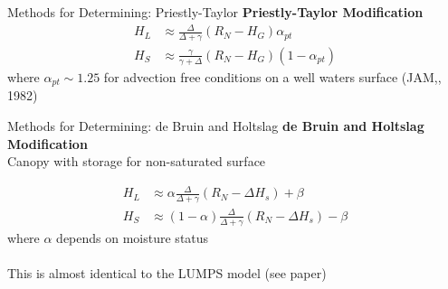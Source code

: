 
\begin{frame}{Methods for Determining: Priestly-Taylor}
\textbf{Priestly-Taylor Modification}
\begin{align*}
H_L &\approx \frac{\Delta}{\Delta + \gamma} (R_N - H_G) \alpha_{pt}\\
H_S &\approx \frac{\gamma}{\gamma + \Delta}(R_N - H_G)(1-\alpha_{pt})
\end{align*}
where $\alpha_{pt}\sim 1.25$ for advection free conditions on a well waters surface (JAM,, 1982)

\end{frame}


\begin{frame}{Methods for Determining: de Bruin and Holtslag}
\textbf{de Bruin and Holtslag Modification}\\
Canopy with storage for non-saturated surface

\begin{align*}
H_L &\approx \alpha \frac{\Delta}{\Delta + \gamma} (R_N - \Delta H_s) + \beta\\
H_S &\approx (1-\alpha) \frac{\Delta}{\Delta + \gamma}(R_N - \Delta H_s) - \beta
\end{align*}
where $\alpha$ depends on moisture status
~\\~\\
This is almost identical to the LUMPS model (see paper)

\end{frame}


